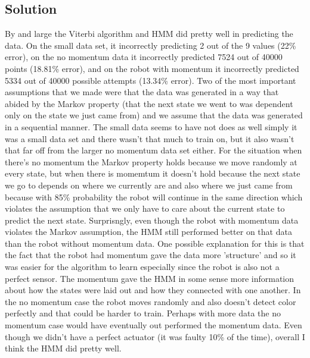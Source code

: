 \documentclass[submit]{harvardml}
\begin{document}
\subsection*{Solution}
By and large the Viterbi algorithm and HMM did pretty well in predicting the data.  On the small data set, it incorrectly predicting 2 out of the 9 values (22\% error), on the no momentum data it incorrectly predicted 7524 out of 40000  points (18.81\% error), and on the robot with momentum it incorrectly predicted 5334 out of 40000 possible attempts (13.34\% error). Two of the most important assumptions that we made were that the data was generated in a way that abided by the Markov property (that the next state we went to was dependent only on the state we just came from) and we assume that the data was generated in a sequential manner.   The small data seems to have not does as well simply it was a small data set and there wasn't that much to train on, but it also wasn't that far off from the larger no momentum data set either.  For the situation when there's no momentum the Markov property holds because we move randomly at every state, but when there is momemtum it doesn't hold because the next state we go to depends on where we currently are and also where we just came from because with 85\% probability the robot will continue in the same direction which violates the assumption that we only have to care about the current state to predict the next state. Surprisngly, even though the robot with momentum data violates the Markov assumption, the HMM still performed better on that data than the robot without momentum data.  One possible explanation for this is that the fact that the robot had momentum gave the data more 'structure' and so it was easier for the algorithm to learn especially since the robot is also not a perfect sensor. The momentum gave the HMM in some sense more information about how the states were laid out and how they connected with one another. In the no momentum case the robot moves randomly and also doesn't detect color perfectly and that could be harder to train. Perhaps with more data the no momentum case would have eventually out performed the momentum data. Even though we didn't have a perfect actuator (it was faulty 10\% of the time), overall I think the HMM did pretty well.  
\end{document}
